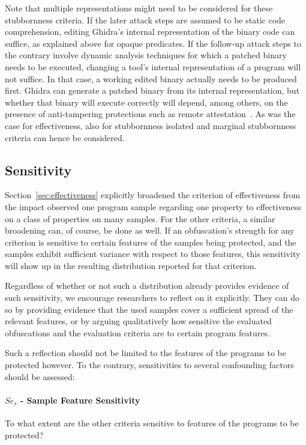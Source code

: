 Note that multiple representations might need to be considered for these stubbornness criteria. If the later attack steps are assumed to be static code comprehension, editing Ghidra's internal representation of the binary code can suffice, as explained above for opaque predicates. If the follow-up attack steps to the contrary involve dynamic analysis techniques for which a patched binary needs to be executed, changing a tool's internal representation of a program will not suffice. In that case, a working edited binary actually needs to be produced first. Ghidra can generate a patched binary from its internal representation, but whether that binary will execute correctly will depend, among others, on the presence of anti-tampering protections such as remote attestation~\cite{viticchie2016reactive}. As was the case for effectiveness, also for stubbornness isolated and marginal stubbornness criteria can hence be considered.  



\subsection{Sensitivity}
\label{sec:sensitivity}
Section~\ref{sec:effectiveness} explicitly broadened the criterion of effectiveness from the impact observed one program sample regarding one property to effectiveness on a class of properties on many samples. For the other criteria, a similar broadening can, of course, be done as well. If an obfuscation's strength for any criterion is sensitive to certain features of the samples being protected, and the samples exhibit sufficient variance with respect to those features, this sensitivity will show up in the resulting distribution reported for that criterion. 

Regardless of whether or not such a distribution already provides evidence of such sensitivity, we encourage researchers to reflect on it explicitly. They can do so by providing evidence that the used samples cover a sufficient spread of the relevant features, or by arguing qualitatively how sensitive the evaluated obfuscations and the evaluation criteria are to certain program features. 

Such a reflection should not be limited to the features of the programs to be protected however. To the contrary, sensitivities to several confounding factors should be assessed:

\paragraph{$Se_s$ - Sample Feature Sensitivity} To what extent are the other criteria sensitive to features of the programs to be protected?

